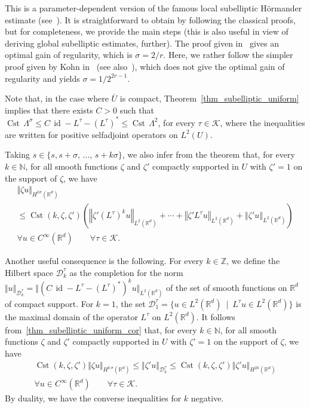 \documentclass[10pt]{amsart}
\theoremstyle{definition}\newtheorem{defi}[theo]{Definition}\newtheorem{rema}[theo]{Remark}\newtheorem{exam}[theo]{Example}\newtheorem{exem}[theo]{Example}\newtheorem{nota}[theo]{Notation}
\newcommand*\R{\mathbb{R}}
\newcommand*\N{\mathbb{N}}
\newcommand*\Z{\mathbb{Z}}
\newcommand{\calK}{\mathcal{K}}
\newcommand{\calD}{\mathcal{D}}
\DeclareMathOperator{\Cst}{Cst}
\DeclareMathOperator{\id}{id}
\renewcommand{\leq}{\leqslant}
\let\oldforall\forall
\renewcommand*{\forall}{\mathrel{\oldforall}}
\begin{document}
This is a parameter-dependent version of the famous local subelliptic H\"ormander estimate (see~\cite{Ho-67}). It is straightforward to obtain by following the classical proofs, but for completeness, we provide the main steps (this is also useful in view of deriving global subelliptic estimates, further). The proof given in~\cite{Ho-67} gives an optimal gain of regularity, which is $\sigma=2/r$. Here, we rather follow the simpler proof given by Kohn in~\cite{Kohn1973} (see also~\cite{HelfferNier}), which does not give the optimal gain of regularity and yields $\sigma=1/2^{2r-1}$.

Note that, in the case where $\overline{U}$ is compact, Theorem~\ref{thm_subelliptic_uniform} implies that there exists $C>0$ such that $\Cst\, \Lambda^{\sigma} \leq C\,\id - L^\tau - (L^\tau)^* \leq \Cst\, \Lambda^2$, for every $\tau\in\calK$, where the inequalities are written for positive selfadjoint operators on $L^2(U)$.


Taking $s\in\{s,s+\sigma,\,\ldots,\,s+k\sigma\}$, we also infer from the theorem that, for every $k\in\N$, for all smooth functions $\zeta$ and $\zeta'$ compactly supported in $U$ with $\zeta'=1$ on the support of $\zeta$, we have
\begin{multline}\label{thm_subelliptic_uniform_cor}
\Vert \zeta u\Vert_{H^{k\sigma}\left(\R^d\right)} \\
\leq \Cst\left(k,\zeta,\zeta'\right) \left(\left\Vert \zeta' (L^\tau)^k u\right\Vert_{L^2\left(\R^d\right)} + \cdots+\left\Vert \zeta' L^\tau u\right\Vert_{L^2\left(\R^d\right)} + \left\Vert \zeta' u \right\Vert_{L^2\left(\R^d\right)} \right) \\
\forall u\in C^\infty\left(\R^d\right)\qquad \forall \tau\in\calK.
\end{multline}

Another useful consequence is the following. For every $k\in\Z$, we define the Hilbert space $\calD^\tau_k$ as the completion for the norm $\Vert u\Vert_{\calD^\tau_k} = \Vert (C\,\id - L^\tau - (L^\tau)^*)^k u\Vert_{L^2(\R^d)}$ of the set of smooth functions on $\R^d$ of compact support. For $k=1$, the set $\calD^\tau_1=\{ u\in L^2(\R^d)\ \mid\ L^\tau u\in L^2(\R^d)\}$ is the maximal domain of the operator $L^\tau$ on $L^2(\R^d)$. It follows from~\eqref{thm_subelliptic_uniform_cor} that, for every $k\in\N$, for all smooth functions $\zeta$ and $\zeta'$ compactly supported in $U$ with $\zeta'=1$ on the support of $\zeta$, we have
\begin{multline*}
\Cst(k,\zeta,\zeta') \Vert \zeta u \Vert_{H^{k\,\sigma}(\R^d)} \leq \Vert \zeta' u \Vert_{\calD^\tau_k } \leq \Cst(k,\zeta,\zeta') \Vert \zeta' u \Vert_{H^{2k}\left(\R^d\right)} \\
\forall u\in C^\infty\left(\R^d\right)\qquad \forall \tau\in\calK.
\end{multline*}
By duality, we have the converse inequalities for $k$ negative.
\end{document}
